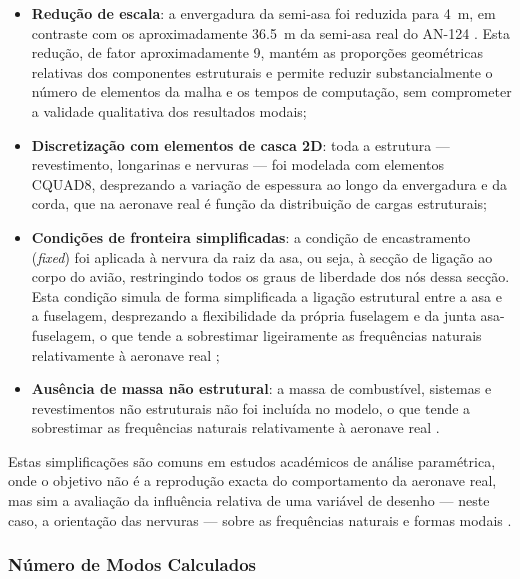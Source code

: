 \documentclass[a4paper,fleqn]{cas-sc}
\begin{document}
\begin{itemize}
    \item \textbf{Redução de escala}: a envergadura da semi-asa foi reduzida para \SI{4}{\meter}, em contraste com os aproximadamente \SI{36.5}{\meter} da semi-asa real do AN-124 \cite{Antonov2004}. Esta redução, de fator aproximadamente 9, mantém as proporções geométricas relativas dos componentes estruturais e permite reduzir substancialmente o número de elementos da malha e os tempos de computação, sem comprometer a validade qualitativa dos resultados modais;

    \item \textbf{Discretização com elementos de casca 2D}: toda a estrutura --- revestimento, longarinas e nervuras --- foi modelada com elementos CQUAD8, desprezando a variação de espessura ao longo da envergadura e da corda, que na aeronave real é função da distribuição de cargas estruturais;

    \item \textbf{Condições de fronteira simplificadas}: a condição de encastramento (\textit{fixed}) foi aplicada à nervura da raiz da asa, ou seja, à secção de ligação ao corpo do avião, restringindo todos os graus de liberdade dos nós dessa secção. Esta condição simula de forma simplificada a ligação estrutural entre a asa e a fuselagem, desprezando a flexibilidade da própria fuselagem e da junta asa-fuselagem, o que tende a sobrestimar ligeiramente as frequências naturais relativamente à aeronave real \cite{Wright2015, Hodges2011};

    \item \textbf{Ausência de massa não estrutural}: a massa de combustível, sistemas e revestimentos não estruturais não foi incluída no modelo, o que tende a sobrestimar as frequências naturais relativamente à aeronave real \cite{Wright2015}.
\end{itemize}

Estas simplificações são comuns em estudos académicos de análise paramétrica, onde o objetivo não é a reprodução exacta do comportamento da aeronave real, mas sim a avaliação da influência relativa de uma variável de desenho --- neste caso, a orientação das nervuras --- sobre as frequências naturais e formas modais \cite{Dowell2004}.

\subsubsection{Número de Modos Calculados}
\end{document}
